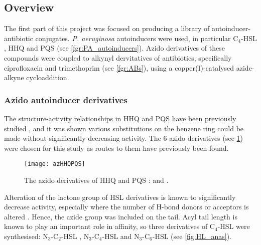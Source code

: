 \subsection{Overview}

The first part of this project was focused on producing a library of autoinducer-antibiotic conjugates. \textit{P. aeruginosa} autoinducers were used, in particular C$_4$-HSL , HHQ  and PQS  (see \ref{fgr:PA_autoinducers}). Azido derivatives of these compounds were coupled to alkynyl dervitatives of antibiotics, specifically ciprofloxacin  and trimethoprim  (see \ref{fgr:ABs}), using a copper(I)-catalysed azide-alkyne cycloaddition\cite{Tornoe2002,ANIE:ANIE2596}.

\subsubsection{Azido autoinducer derivatives}

The structure-activity relationships in HHQ  and PQS  have been previously studied \cite{Lu2012,Lu2014,Hodgkinson2010}, and it was shown various substitutions on the benzene ring could be made without significantly decreasing activity. The 6-azido derivatives (see \ref{fgr:azHHQPQS}) were chosen for this study as routes to them have previously been found\cite{Baker2015}.


\begin{figure}[H]
	\begin{center}
		\texttt{[image: azHHQPQS]}
		\caption{The azido derivatives of HHQ  and PQS :  and . \label{fgr:azHHQPQS}}
	\end{center}
\end{figure}

Alteration of the lactone group of HSL derivatives is known to significantly decrease activity, especially where the number of H-bond donors or acceptors is altered \cite{Galloway2011}. Hence, the azide group was included on the tail\cite{Stacy2013}. Acyl tail length is known to play an important role in affinity\cite{Galloway2011}, so three derivatives of C$_4$-HSL  were synthesised: N$_3$-C$_2$-HSL , N$_3$-C$_4$-HSL  and N$_3$-C$_6$-HSL  (see \ref{fig:HL_anas}).

